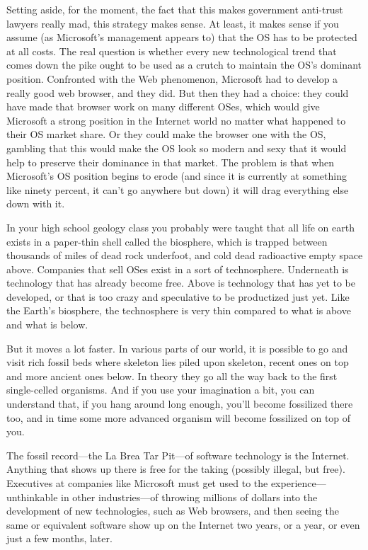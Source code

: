 \documentclass[
  fontsize=11pt,
  paper=landscape,
  twocolumn=true,
  pagesize=pdftex,
  headings=small,
  DIV=15,
  ]{scrartcl}
\begin{document}
Setting aside, for the moment, the fact that this makes government
anti-trust lawyers really mad, this strategy makes sense. At least, it
makes sense if you assume (as Microsoft's management appears to) that
the OS has to be protected at all costs. The real question is whether
every new technological trend that comes down the pike ought to be used
as a crutch to maintain the OS's dominant position. Confronted with the
Web phenomenon, Microsoft had to develop a really good web browser, and
they did. But then they had a choice: they could have made that browser
work on many different OSes, which would give Microsoft a strong
position in the Internet world no matter what happened to their OS
market share. Or they could make the browser one with the OS, gambling
that this would make the OS look so modern and sexy that it would help
to preserve their dominance in that market. The problem is that when
Microsoft's OS position begins to erode (and since it is currently at
something like ninety percent, it can't go anywhere but down) it will
drag everything else down with it.

In your high school geology class you probably were taught that all life
on earth exists in a paper-thin shell called the biosphere, which is
trapped between thousands of miles of dead rock underfoot, and cold dead
radioactive empty space above. Companies that sell OSes exist in a sort
of technosphere. Underneath is technology that has already become free.
Above is technology that has yet to be developed, or that is too crazy
and speculative to be productized just yet. Like the Earth's biosphere,
the technosphere is very thin compared to what is above and what is
below.

But it moves a lot faster. In various parts of our world, it is possible
to go and visit rich fossil beds where skeleton lies piled upon
skeleton, recent ones on top and more ancient ones below. In theory they
go all the way back to the first single-celled organisms. And if you use
your imagination a bit, you can understand that, if you hang around long
enough, you'll become fossilized there too, and in time some more
advanced organism will become fossilized on top of you.

The fossil record---the La Brea Tar Pit---of software technology is the
Internet. Anything that shows up there is free for the taking (possibly
illegal, but free). Executives at companies like Microsoft must get used
to the experience---unthinkable in other industries---of throwing
millions of dollars into the development of new technologies, such as
Web browsers, and then seeing the same or equivalent software show up on
the Internet two years, or a year, or even just a few months, later.
\end{document}
